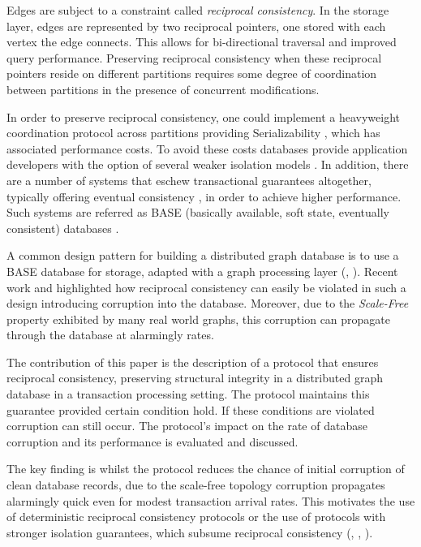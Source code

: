 \documentclass[sigplan,10pt]{acmart}
\begin{document}
Edges are subject to a constraint called \emph{reciprocal consistency}. In the storage layer, edges are represented by two reciprocal pointers, one stored with each vertex the edge connects. This allows for bi-directional traversal and improved query performance. Preserving reciprocal consistency when these reciprocal pointers reside on different partitions requires some degree of coordination between partitions in the presence of concurrent modifications.

In order to preserve reciprocal consistency, one could implement a heavyweight coordination protocol across partitions providing Serializability \cite{Bernstein1987}, which has associated performance costs. To avoid these costs databases provide application developers with the option of several weaker isolation models \cite{Berenson1995}. In addition, there are a number of systems that eschew transactional guarantees altogether, typically offering eventual consistency \cite{Bailis2013}, in order to achieve higher performance. Such systems are referred as  BASE (basically available, soft state, eventually consistent) databases \cite{Pritchett2008}.

A common design pattern for building a distributed graph database is to use a BASE database for storage, adapted with a graph processing layer (\cite{janusgraph}, \cite{TitanDB}). Recent work \cite{Ezhilchelvan2018} and \cite{Webber2019} highlighted how reciprocal consistency can easily be violated in such a design introducing corruption into the database. Moreover, due to the \emph{Scale-Free} \cite{ScaleFree} property exhibited by many real world graphs, this corruption can propagate through the database at alarmingly rates.

The contribution of this paper is the description of a protocol that ensures reciprocal consistency, preserving structural integrity in a distributed graph database in a transaction processing setting. The protocol maintains this guarantee provided certain condition hold. If these conditions are violated corruption can still occur. The protocol's impact on the rate of database corruption and its performance is evaluated and discussed.

The key finding is whilst the protocol reduces the chance of initial corruption of clean database records, due to the scale-free topology corruption propagates alarmingly quick even for modest transaction arrival rates. This motivates the use of deterministic reciprocal consistency protocols or the use of protocols with stronger isolation guarantees, which subsume reciprocal consistency (\cite{Bailis2014}, \cite{Berenson1995}, \cite{Bernstein1987}).
\end{document}
